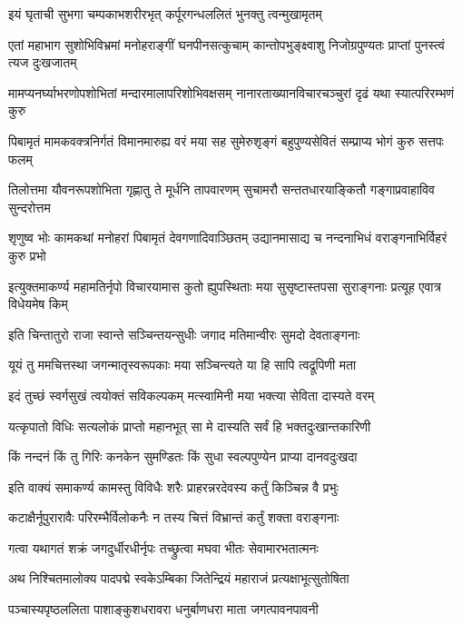 \twolineshloka
{इयं घृताची सुभगा चम्पकाभशरीरभृत्}
{कर्पूरगन्धललितं भुनक्तु त्वन्मुखामृतम्}%

\fourlineindentedshloka
{एतां महाभाग सुशोभिविभ्रमां}
{मनोहराङ्गीं घनपीनसत्कुचाम्}
{कान्तोपभुङ्क्ष्वाशु निजोग्रपुण्यतः}
{प्राप्तां पुनस्त्वं त्यज दुःखजातम्}%

\fourlineindentedshloka
{मामप्यनर्घ्याभरणोपशोभितां}
{मन्दारमालापरिशोभिवक्षसम्}
{नानारताख्यानविचारचञ्चुरां}
{दृढं यथा स्यात्परिरम्भणं कुरु}%

\fourlineindentedshloka
{पिबामृतं मामकवक्त्रनिर्गतं}
{विमानमारुह्य वरं मया सह}
{सुमेरुशृङ्गं बहुपुण्यसेवितं}
{सम्प्राप्य भोगं कुरु सत्तपः फलम्}%

\fourlineindentedshloka
{तिलोत्तमा यौवनरूपशोभिता}
{गृह्णातु ते मूर्धनि तापवारणम्}
{सुचामरौ सन्ततधारयाङ्कितौ}
{गङ्गाप्रवाहाविव सुन्दरोत्तम}%

\fourlineindentedshloka
{शृणुष्व भोः कामकथां मनोहरां}
{पिबामृतं देवगणादिवाञ्छितम्}
{उद्यानमासाद्य च नन्दनाभिधं}
{वराङ्गनाभिर्विहरं कुरु प्रभो}%

\fourlineindentedshloka
{इत्युक्तमाकर्ण्य महामतिर्नृपो}
{विचारयामास कुतो ह्युपस्थिताः}
{मया सुसृष्टास्तपसा सुराङ्गनाः}
{प्रत्यूह एवात्र विधेयमेष किम्}%

\twolineshloka
{इति चिन्तातुरो राजा स्वान्ते सञ्चिन्तयन्सुधीः}
{जगाद मतिमान्वीरः सुमदो देवताङ्गनाः}%

\twolineshloka
{यूयं तु ममचित्तस्था जगन्मातृस्वरूपकाः}
{मया सञ्चिन्त्यते या हि सापि त्वद्रूपिणी मता}%

\twolineshloka
{इदं तुच्छं स्वर्गसुखं त्वयोक्तं सविकल्पकम्}
{मत्स्वामिनी मया भक्त्या सेविता दास्यते वरम्}%

\twolineshloka
{यत्कृपातो विधिः सत्यलोकं प्राप्तो महानभूत्}
{सा मे दास्यति सर्वं हि भक्तदुःखान्तकारिणी}%

\twolineshloka
{किं नन्दनं किं तु गिरिः कनकेन सुमण्डितः}
{किं सुधा स्वल्पपुण्येन प्राप्या दानवदुःखदा}%

\twolineshloka
{इति वाक्यं समाकर्ण्य कामस्तु विविधैः शरैः}
{प्राहरन्नरदेवस्य कर्तुं किञ्चिन्न वै प्रभुः}%

\twolineshloka
{कटाक्षैर्नूपुरारावैः परिरम्भैर्विलोकनैः}
{न तस्य चित्तं विभ्रान्तं कर्तुं शक्ता वराङ्गनाः}%

\twolineshloka
{गत्वा यथागतं शक्रं जगदुर्धीरधीर्नृपः}
{तच्छ्रुत्वा मघवा भीतः सेवामारभतात्मनः}%

\twolineshloka
{अथ निश्चितमालोक्य पादपद्मे स्वकेऽम्बिका}
{जितेन्द्रियं महाराजं प्रत्यक्षाभूत्सुतोषिता}%

\twolineshloka
{पञ्चास्यपृष्ठललिता पाशाङ्कुशधरावरा}
{धनुर्बाणधरा माता जगत्पावनपावनी}%

